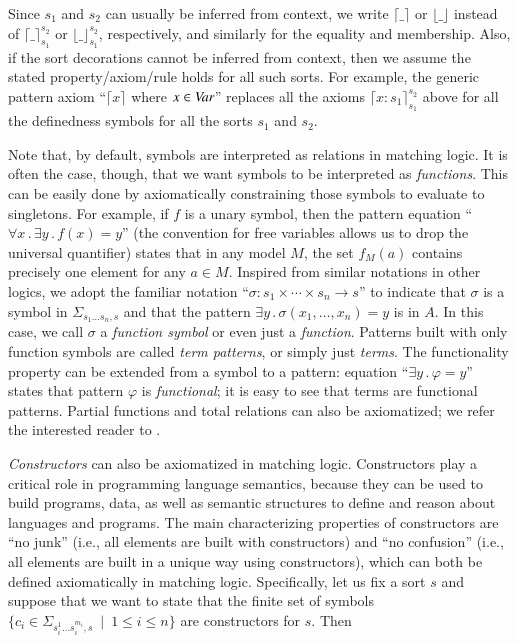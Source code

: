 \documentclass[UTF8,11pt]{article}
\theoremstyle{plain}
\theoremstyle{definition}
\theoremstyle{remark}
\newcommand{\ra}{\rightarrow}
\begin{document}
Since $s_1$ and $s_2$ can usually be inferred from context,
we write $\lceil\_\rceil$ or $\lfloor\_\rfloor$ instead of
$\lceil\_\rceil_{s_1}^{s_2}$ or $\lfloor\_\rfloor_{s_1}^{s_2}$, respectively,
and similarly for the equality and membership.
Also, if the sort decorations cannot be inferred from context, then we assume
the stated property/axiom/rule holds for all such sorts.
%
For example, the generic pattern axiom ``$\lceil x \rceil$ where $x\in\textit{Var}$''
replaces all the axioms $\lceil x\!:\!s_1 \rceil_{s_1}^{s_2}$ above for all
the definedness symbols for all the sorts $s_1$ and $s_2$.

Note that, by default, symbols are interpreted as relations in matching logic.
It is often the case, though, that we want symbols to be interpreted as
\emph{functions}.
This can be easily done by axiomatically constraining those symbols to evaluate to
singletons.
For example, if $f$ is a unary symbol, then the pattern equation
``$\forall x\,.\,\exists y\,.\,f(x) = y$'' (the convention for free variables
allows us to drop the universal quantifier) states that in any model
$M$, the set $f_M(a)$ contains precisely one element for any $a\in M$.
%
Inspired from similar notations in other logics,
we adopt the familiar notation
``$\sigma : s_1 \times \cdots \times s_n \ra s$''
to indicate that $\sigma$ is a symbol in $\Sigma_{s_1\ldots s_n,s}$ and that
the pattern
$
\exists y\,.\,\sigma(x_1,\ldots,x_n) = y
$ is in $A$.
In this case, we call $\sigma$ a \emph{function symbol} or even just a
\emph{function}.
Patterns built with only function symbols are called
\emph{term patterns}, or simply just \emph{terms}.
The functionality property can be extended from a symbol to
a pattern: equation ``$\exists y\,.\,\varphi = y$'' states that pattern
$\varphi$ is \emph{functional}; it is easy to see that terms are
functional patterns.
Partial functions and total relations can also be axiomatized;
we refer the interested reader to \cite{rosu-2017-lmcs}.

\emph{Constructors} can also be axiomatized in matching logic.
Constructors play a critical role in programming language semantics,
because they can be used to build programs, data, as well as semantic
structures to define and reason about languages and programs.
The main characterizing properties of constructors are ``no junk''
(i.e., all elements are built with constructors) and ``no confusion''
(i.e., all elements are built in a unique way using constructors),
which can both be defined axiomatically in matching logic.
Specifically, let us fix a sort $s$ and suppose that we want to state
that the finite set of symbols
$\{c_i \in \Sigma_{s_i^1...s_i^{m_i},s} \ \mid \ 1 \leq i \leq n\}$
are constructors for $s$.
Then
\end{document}
